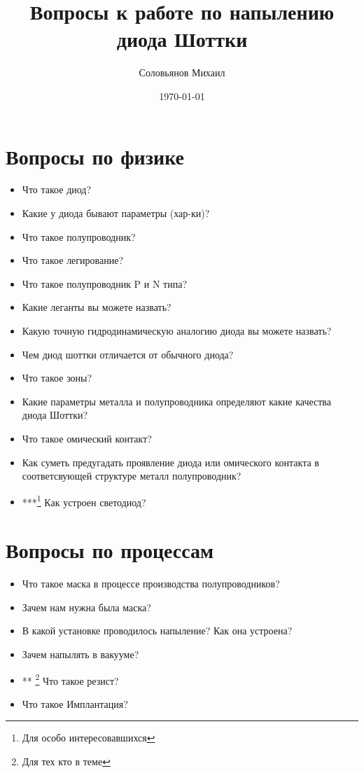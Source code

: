 \documentclass[a4paper,12pt]{article} %
\author{Соловьянов Михаил}
\title{Вопросы к работе по напылению диода Шоттки}
\date{\today}
\begin{document}
\maketitle


\section{Вопросы по физике}
\begin{itemize}
  \item Что такое диод?
  \item Какие у диода бывают параметры (хар-ки)?
  \item Что такое полупроводник?
  \item Что такое легирование?
  \item Что такое полупроводник P и N типа?
  \item Какие леганты вы можете назвать?
  \item Какую точную гидродинамическую аналогию диода вы можете назвать?
  \item Чем диод шоттки отличается от обычного диода?
  \item Что такое зоны?
  \item Какие параметры металла и полупроводника определяют какие качества диода Шоттки?
  \item Что такое омический контакт?
  \item Как суметь предугадать проявление диода или омического контакта в соответсвующей структуре металл полупроводник?
  \item ***\footnote{Для особо интересовавшихся} Как устроен светодиод?
\end{itemize}

\section{Вопросы по процессам}

\begin{itemize}
  \item Что такое маска в процессе производства полупроводников?
  \item Зачем нам нужна была маска?
  \item В какой установке проводилось напыление? Как она устроена?
  \item Зачем напылять в вакууме?
  \item ** \footnote{Для тех кто в теме} Что такое резист?
  \item Что такое Имплантация?
\end{itemize}
\end{document}

